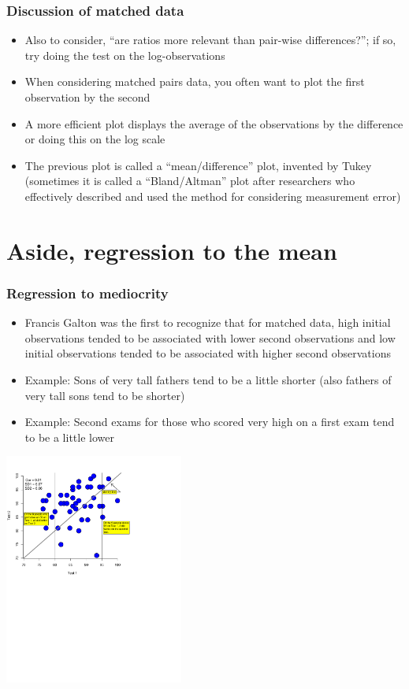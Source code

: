 \documentclass[aspectratio=169]{beamer}
\begin{document}
\begin{frame}\frametitle{Discussion of matched data}
  \begin{itemize}
  \item Also to consider, ``are ratios more relevant than pair-wise
    differences?''; if so, try doing the test on the log-observations
  \item When considering matched pairs data, you often want to plot the first observation by the second
  \item A more efficient plot displays the average of the observations by the difference or doing this on the log scale
  \item The previous plot is called a ``mean/difference'' plot,
    invented by Tukey (sometimes it is called a ``Bland/Altman'' plot
    after researchers who effectively described and used the method
    for considering measurement error)
  \end{itemize}
\end{frame}

\section{Aside,  regression to the mean}
\begin{frame} \frametitle{Regression to mediocrity}
  \begin{itemize}
  \item Francis Galton was the first to recognize that for matched
    data, high initial observations tended to be associated with lower
    second observations and low initial observations tended to be
    associated with higher second observations
  \item Example: Sons of very tall fathers tend to be a little shorter
    (also fathers of very tall sons tend to be shorter)
  \item Example: Second exams for those who scored very high on a
    first exam tend to be a little lower
  \end{itemize}
\end{frame}

\begin{frame}
  \begin{center}
    \includegraphics[height=3in]{rtmAnotated.pdf}
  \end{center}
\end{frame}
\end{document}
